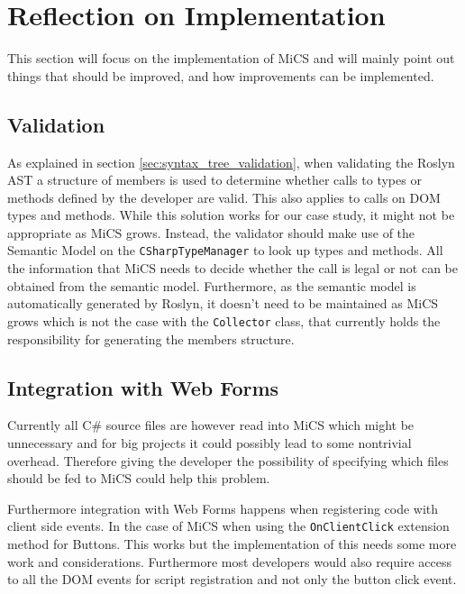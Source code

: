 \section{Reflection on Implementation} %
\label{sec:reflection_on_implementation}
This section will focus on the implementation of MiCS and will mainly point out things that should be improved, and how improvements can be implemented.

\subsection{Validation} %
\label{ssub:validation}
As explained in section \ref{sec:syntax_tree_validation}, when validating the Roslyn AST a structure of members is used to determine whether calls to types or methods defined by the developer are valid. This also applies to calls on DOM types and methods. While this solution works for our case study, it might not be appropriate as MiCS grows. Instead, the validator should make use of the Semantic Model on the \texttt{CSharpTypeManager} to look up types and methods. All the information that MiCS needs to decide whether the call is legal or not can be obtained from the semantic model. Furthermore, as the semantic model is automatically generated by Roslyn, it doesn't need to be maintained as MiCS grows which is not the case with the \texttt{Collector} class, that currently holds the responsibility for generating the members structure.

\subsection{Integration with Web Forms} %
\label{ssub:integration_with_web_forms}
	Currently all C\# source files are however read into MiCS which might be unnecessary and for big projects it could possibly lead to some nontrivial overhead. Therefore giving the developer the possibility of specifying which files should be fed to MiCS could help this problem.

	Furthermore integration with Web Forms happens when registering code with client side events. In the case of MiCS when using the \texttt{OnClientClick} extension method for Buttons. This works but the implementation of this needs some more work and considerations. Furthermore most developers would also require access to all the DOM events for script registration and not only the button click event.


